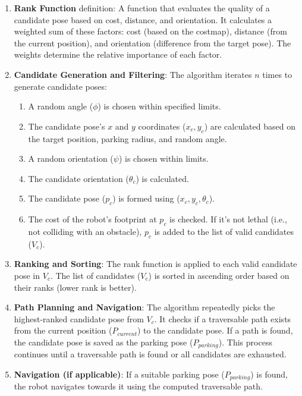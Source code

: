 \begin{enumerate}
    \item \textbf{Rank Function} definition: A function that evaluates the quality of a candidate pose 
    based on cost, distance, and orientation. It calculates a weighted sum of these factors: 
    cost (based on the costmap), distance (from the current position), and orientation 
    (difference from the target pose). The weights determine the relative importance of each factor.
    \item \textbf{Candidate Generation and Filtering}: The algorithm iterates $n$ times to generate candidate poses:
        \begin{enumerate}
            \item A random angle ($\phi$) is chosen within specified limits.
            \item The candidate pose's $x$ and $y$ coordinates ($x_c, y_c$) are calculated based on the target position,
            parking radius, and random angle.
            \item A random orientation ($\psi$) is chosen within limits.
            \item The candidate orientation ($\theta_c$) is calculated.
            \item The candidate pose ($p_c$) is formed using ($x_c, y_c, \theta_c$).
            \item The cost of the robot's footprint at $p_c$ is checked. If it's not lethal 
            (i.e., not colliding with an obstacle), $p_c$ is added to the list of valid candidates ($V_c$).
        \end{enumerate}
    \item \textbf{Ranking and Sorting}: The rank function is applied to each valid candidate pose in $V_c$. 
    The list of candidates ($V_c$) is sorted in ascending order based on their ranks (lower rank is better).
    \item  \textbf{Path Planning and Navigation}: The algorithm repeatedly picks the highest-ranked candidate pose from $V_c$.
    It checks if a traversable path exists from the current position ($P_{current}$) to the candidate pose. 
    If a path is found, the candidate pose is saved as the parking pose ($P_{parking}$). 
    This process continues until a traversable path is found or all candidates are exhausted.
    \item \textbf{Navigation (if applicable)}: If a suitable parking pose ($P_{parking}$) is found, 
    the robot navigates towards it using the computed traversable path.
\end{enumerate}

